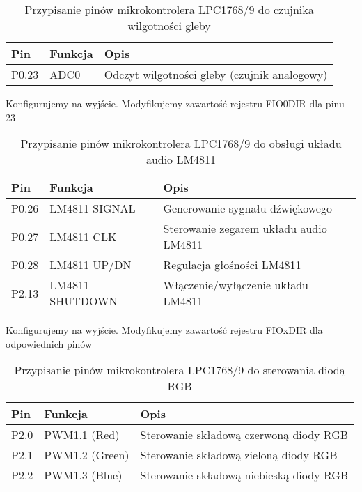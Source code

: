 \begin{table}[H]
\centering
\caption{Przypisanie pinów mikrokontrolera LPC1768/9 do czujnika wilgotności gleby}
\begin{tabular}{@{}lll@{}}
\toprule
\textbf{Pin} & \textbf{Funkcja}                  & \textbf{Opis} \\ \midrule
P0.23        & ADC0                             & Odczyt wilgotności gleby (czujnik analogowy) \\
\bottomrule
\end{tabular}
\end{table}

Konfigurujemy na wyjście. Modyfikujemy zawartość rejestru FIO0DIR dla pinu 23

\begin{table}[H]
\centering
\caption{Przypisanie pinów mikrokontrolera LPC1768/9 do obsługi układu audio LM4811}
\begin{tabular}{@{}lll@{}}
\toprule
\textbf{Pin} & \textbf{Funkcja}                  & \textbf{Opis} \\ \midrule
P0.26        & LM4811 SIGNAL                     & Generowanie sygnału dźwiękowego \\
P0.27        & LM4811 CLK                       & Sterowanie zegarem układu audio LM4811 \\
P0.28        & LM4811 UP/DN                     & Regulacja głośności LM4811 \\
P2.13        & LM4811 SHUTDOWN                  & Włączenie/wyłączenie układu LM4811 \\
\bottomrule
\end{tabular}
\end{table}

Konfigurujemy na wyjście. Modyfikujemy zawartość rejestru FIOxDIR dla odpowiednich pinów


\begin{table}[H]
\centering
\caption{Przypisanie pinów mikrokontrolera LPC1768/9 do sterowania diodą RGB}
\begin{tabular}{@{}lll@{}}
\toprule
\textbf{Pin} & \textbf{Funkcja}                  & \textbf{Opis} \\ \midrule
P2.0         & PWM1.1 (Red)                     & Sterowanie składową czerwoną diody RGB \\
P2.1         & PWM1.2 (Green)                   & Sterowanie składową zieloną diody RGB \\
P2.2         & PWM1.3 (Blue)                    & Sterowanie składową niebieską diody RGB \\
\bottomrule
\end{tabular}
\end{table}

